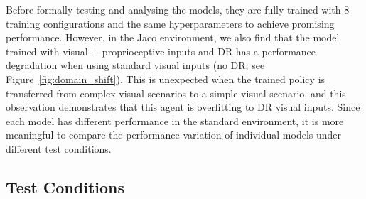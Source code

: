 Before formally testing and analysing the models, they are fully trained with 8 training configurations and the same hyperparameters to achieve promising performance. However, in the Jaco environment, we also find that the model trained with visual + proprioceptive inputs and DR has a performance degradation when using standard visual inputs (no DR; see Figure~\ref{fig:domain_shift}). This is unexpected when the trained policy is transferred from complex visual scenarios to a simple visual scenario, and this observation demonstrates that this agent is overfitting to DR visual inputs. Since each model has different performance in the standard environment, it is more meaningful to compare the performance variation of individual models under different test conditions.

\subsection{Test Conditions}
